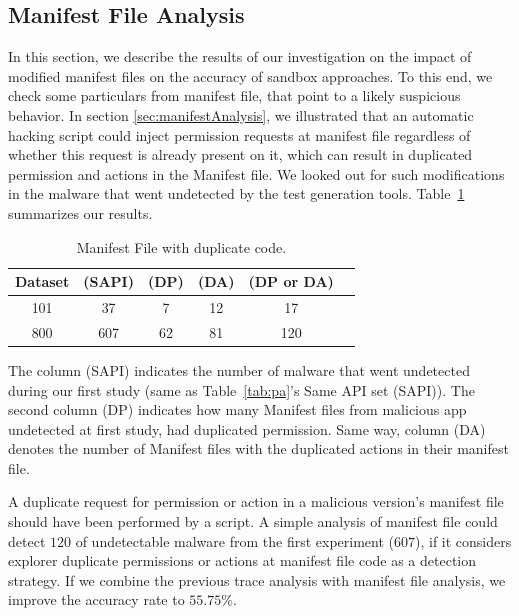 \subsection{Manifest File Analysis}\label{sec:manifestResults}

In this section, we describe the results of our investigation on the impact of modified manifest files on the accuracy of sandbox approaches. 
To this end, we check some particulars from manifest file, that point to a likely suspicious behavior. In section \ref{sec:manifestAnalysis}, we illustrated that an automatic hacking script could inject permission requests at manifest file regardless of whether this request is already present on it, which can result in duplicated permission and actions in the Manifest file. We looked out for such modifications in the malware that went undetected by the test generation tools. Table~\ref{tab:mfa} summarizes our results.

\begin{table}[ht]
  \caption{Manifest File with duplicate code.}
  \centering
  \begin{small}
 \begin{tabular}{cccccc}
   \toprule
   Dataset & (SAPI) & (DP) & (DA) & (DP or DA) \\   \midrule
   101 & 37 & 7 & 12 & 17 \\ 
   800 & 607 & 62 & 81 & 120 \\ 
   
 \bottomrule
 \end{tabular}
 \end{small}
 \label{tab:mfa}
\end{table}

The column (SAPI) indicates the number of malware that went undetected during our first study (same as Table~\ref{tab:pa}'s Same API set (SAPI)). The second column (DP) indicates how many Manifest files from malicious app undetected at first study, had duplicated permission. Same way, column (DA) denotes the number of Manifest files with the duplicated actions in their manifest file.

A duplicate request for permission or action in a malicious version's manifest file should have been performed by a script. A simple analysis of manifest file could detect $120$ of undetectable malware from the first experiment ($607$), if it considers explorer duplicate permissions or actions at manifest file code as a detection strategy. If we combine the previous trace analysis with manifest file analysis, we improve the accuracy rate to $55.75\%$.

